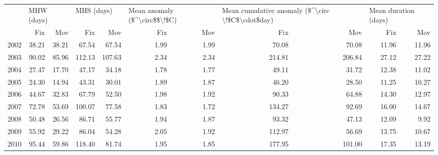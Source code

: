 \begin{tabular}{lrrrrrrrrrr}
\toprule
{} & \multicolumn{2}{l}{MHW (days)} & \multicolumn{2}{l}{MHS (days)} & \multicolumn{2}{l}{Mean anomaly  (\$\textasciicircum \textbackslash circ\$\$\textbackslash !\$C)} & \multicolumn{2}{l}{Mean cumulative anomaly (\$\textasciicircum \textbackslash circ \textbackslash !\$C\$\textbackslash cdot\$day)} & \multicolumn{2}{l}{Mean duration (days)} \\
{} &        Fix &    Mov &        Fix &     Mov &                           Fix &   Mov &                                              Fix &     Mov &                  Fix &    Mov \\
\midrule
2002 &      38.21 &  38.21 &      67.54 &   67.54 &                          1.99 &  1.99 &                                            70.08 &   70.08 &                11.96 &  11.96 \\
2003 &      90.02 &  85.96 &     112.13 &  107.63 &                          2.34 &  2.34 &                                           214.81 &  206.84 &                27.12 &  27.22 \\
2004 &      27.47 &  17.70 &      47.17 &   34.18 &                          1.78 &  1.77 &                                            49.11 &   31.72 &                12.38 &  11.02 \\
2005 &      24.30 &  14.94 &      43.31 &   30.01 &                          1.89 &  1.87 &                                            46.20 &   28.50 &                11.25 &  10.27 \\
2006 &      44.67 &  32.83 &      67.79 &   52.50 &                          1.98 &  1.92 &                                            90.33 &   64.88 &                14.30 &  12.97 \\
2007 &      72.78 &  53.69 &     100.07 &   77.58 &                          1.83 &  1.72 &                                           134.27 &   92.69 &                16.00 &  14.67 \\
2008 &      50.48 &  26.56 &      86.71 &   55.77 &                          1.94 &  1.87 &                                            93.32 &   47.13 &                12.09 &   9.92 \\
2009 &      55.92 &  29.22 &      86.04 &   54.28 &                          2.05 &  1.92 &                                           112.97 &   56.69 &                13.75 &  10.67 \\
2010 &      95.44 &  59.86 &     118.40 &   81.74 &                          1.95 &  1.85 &                                           177.95 &  101.00 &                17.35 &  13.19 \\

\end{tabular}
